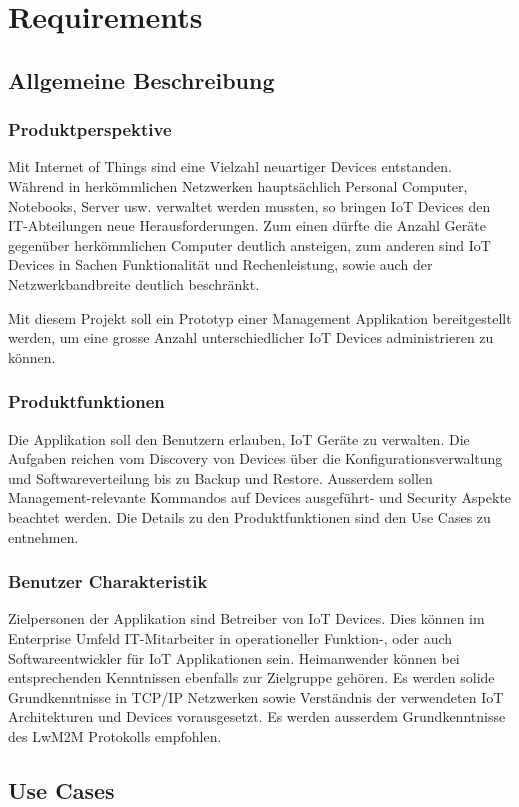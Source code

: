 \chapter{Requirements}
\section{Allgemeine Beschreibung}
\subsection{Produktperspektive}
Mit Internet of Things sind eine Vielzahl neuartiger Devices entstanden. Während in herkömmlichen Netzwerken hauptsächlich Personal Computer, Notebooks, Server usw. verwaltet werden mussten, so bringen IoT Devices den IT-Abteilungen neue Herausforderungen. Zum einen dürfte die Anzahl Geräte gegenüber herkömmlichen Computer deutlich ansteigen, zum anderen sind IoT Devices in Sachen Funktionalität und Rechenleistung, sowie auch der Netzwerkbandbreite deutlich beschränkt. 

Mit diesem Projekt soll ein Prototyp einer Management Applikation bereitgestellt werden, um eine grosse Anzahl unterschiedlicher IoT Devices administrieren zu können. 
\subsection{Produktfunktionen}
Die Applikation soll den Benutzern erlauben, IoT Geräte zu verwalten. Die Aufgaben reichen vom Discovery von Devices über die Konfigurationsverwaltung und Softwareverteilung bis zu Backup und Restore. Ausserdem sollen Management-relevante Kommandos auf Devices ausgeführt- und Security Aspekte beachtet werden. Die Details zu den Produktfunktionen sind den Use Cases zu entnehmen.

\subsection{Benutzer Charakteristik}
Zielpersonen der Applikation sind Betreiber von IoT Devices. Dies können im Enterprise Umfeld IT-Mitarbeiter in operationeller Funktion-, oder auch Softwareentwickler für IoT Applikationen sein. Heimanwender können bei entsprechenden Kenntnissen ebenfalls zur Zielgruppe gehören. Es werden solide Grundkenntnisse in TCP/IP Netzwerken sowie Verständnis der verwendeten IoT Architekturen und Devices vorausgesetzt. Es werden ausserdem Grundkenntnisse des LwM2M Protokolls empfohlen. 
\section{Use Cases}
\label{sec:usecases}
